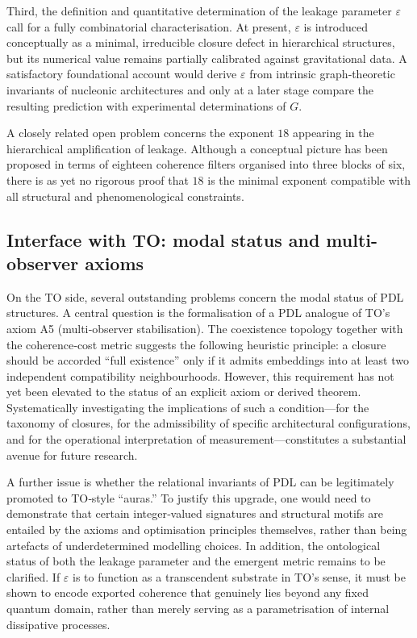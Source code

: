 \documentclass[11pt,a4paper]{article}
\begin{document}
Third, the definition and quantitative determination of the leakage parameter $\varepsilon$ call for a fully combinatorial characterisation. At present, $\varepsilon$ is introduced conceptually as a minimal, irreducible closure defect in hierarchical structures, but its numerical value remains partially calibrated against gravitational data.\cite{Laubscher2026FullPDL,Laubscher2026TopologicalReformulation} A satisfactory foundational account would derive $\varepsilon$ from intrinsic graph‑theoretic invariants of nucleonic architectures and only at a later stage compare the resulting prediction with experimental determinations of $G$.\cite{Laubscher2026TopologicalReformulation,Laubscher2026Exponent18}

A closely related open problem concerns the exponent $18$ appearing in the hierarchical amplification of leakage. Although a conceptual picture has been proposed in terms of eighteen coherence filters organised into three blocks of six, there is as yet no rigorous proof that $18$ is the minimal exponent compatible with all structural and phenomenological constraints.\cite{Laubscher2026Exponent18}

\subsection{Interface with TO: modal status and multi-observer axioms}
On the TO side, several outstanding problems concern the modal status of PDL structures.\cite{Laubscher2026DialogueTO} A central question is the formalisation of a PDL analogue of TO’s axiom A5 (multi‑observer stabilisation). The coexistence topology together with the coherence‑cost metric suggests the following heuristic principle: a closure should be accorded “full existence” only if it admits embeddings into at least two independent compatibility neighbourhoods. However, this requirement has not yet been elevated to the status of an explicit axiom or derived theorem.\cite{Laubscher2026TopologicalReformulation,Laubscher2026DialogueTO} Systematically investigating the implications of such a condition—for the taxonomy of closures, for the admissibility of specific architectural configurations, and for the operational interpretation of measurement—constitutes a substantial avenue for future research.

A further issue is whether the relational invariants of PDL can be legitimately promoted to TO‑style “auras.” To justify this upgrade, one would need to demonstrate that certain integer‑valued signatures and structural motifs are entailed by the axioms and optimisation principles themselves, rather than being artefacts of underdetermined modelling choices.\cite{Laubscher2026CombinatorialProton,Laubscher2026DialogueTO} In addition, the ontological status of both the leakage parameter and the emergent metric remains to be clarified. If $\varepsilon$ is to function as a transcendent substrate in TO’s sense, it must be shown to encode exported coherence that genuinely lies beyond any fixed quantum domain, rather than merely serving as a parametrisation of internal dissipative processes.\cite{Laubscher2026FullPDL,Laubscher2026TopologicalReformulation}
\end{document}
